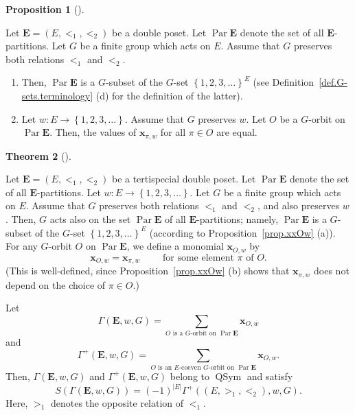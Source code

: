 \documentclass[numbers=enddot,12pt,final,onecolumn,notitlepage,abstracton]{scrartcl}
\theoremstyle{definition}
\newtheorem{theo}{Theorem}[section]
\newenvironment{theorem}[1][]
{\begin{theo}[#1]\begin{leftbar}}
{\end{leftbar}\end{theo}}
\newtheorem{prop}[theo]{Proposition}
\newenvironment{proposition}[1][]
{\begin{prop}[#1]\begin{leftbar}}
{\end{leftbar}\end{prop}}
\let\sumnonlimits\sum
\renewcommand{\sum}{\sumnonlimits\limits}
\newcommand{\xx}{{\mathbf{x}}}
\newcommand{\QSym}{{\operatorname{QSym}}}
\newcommand{\Par}{\operatorname{Par}}
\newcommand{\EE}{{\mathbf{E}}}
\begin{document}
\begin{proposition}
\label{prop.xxOw}
Let $\EE = \left(E, <_1, <_2\right)$ be a double poset.
Let $\Par \EE$ denote the set of all $\EE$-partitions.
Let $G$ be a finite
group which acts on $E$. Assume that $G$ preserves both
relations $<_1$ and $<_2$.

\begin{enumerate}

\item[(a)]
Then, $\Par \EE$ is a $G$-subset of the $G$-set
$\left\{1, 2, 3, \ldots\right\}^E$ (see
Definition~\ref{def.G-sets.terminology} (d) for the definition of
the latter).

\item[(b)] Let $w : E \to \left\{1, 2, 3, \ldots\right\}$. Assume that
$G$ preserves $w$.
Let $O$ be a $G$-orbit on $\Par \EE$. Then, the values of $\xx_{\pi, w}$
for all $\pi \in O$ are equal.

\end{enumerate}

\end{proposition}

\begin{theorem}
\label{thm.antipode.GammawG}
Let $\EE = \left(E, <_1, <_2\right)$ be a tertispecial double poset.
Let $\Par \EE$ denote the set of all $\EE$-partitions.
Let $w : E \to \left\{1, 2, 3, \ldots\right\}$. Let $G$ be a finite
group which acts on $E$. Assume that $G$ preserves both
relations $<_1$ and $<_2$, and also preserves $w$.
Then, $G$ acts also on the set $\Par \EE$ of all
$\EE$-partitions; namely, $\Par \EE$ is a $G$-subset of the $G$-set
$\left\{1, 2, 3, \ldots\right\}^E$ (according to
Proposition~\ref{prop.xxOw} (a)).
For any $G$-orbit $O$ on $\Par \EE$, we define a monomial $\xx_{O, w}$
by
\[ \xx_{O, w} = \xx_{\pi, w} \qquad \text{ for some element }
\pi \text{ of } O .
\]
(This is well-defined, since Proposition~\ref{prop.xxOw} (b) shows
that $\xx_{\pi, w}$ does not depend on the choice of $\pi \in O$.)

Let
\[
\Gamma\left(\EE, w, G\right) = \sum_{O\text{ is a }
G\text{-orbit on } \Par \EE} \xx_{O, w}
\]
and
\[
\Gamma^+\left(\EE, w, G\right) = \sum_{O\text{ is an }E\text{-coeven }
G\text{-orbit on } \Par \EE} \xx_{O, w} .
\]
Then, $\Gamma\left(\EE, w, G\right)$ and
$\Gamma^+\left(\EE, w, G\right)$ belong to $\QSym$ and satisfy
\[
S\left(\Gamma\left(\EE, w, G\right)\right)
= \left(-1\right)^{\left|E\right|}
\Gamma^+\left(\left(E, >_1, <_2\right), w, G\right) .
\]
Here, $>_1$ denotes the opposite relation of $<_1$.
\end{theorem}
\end{document}
